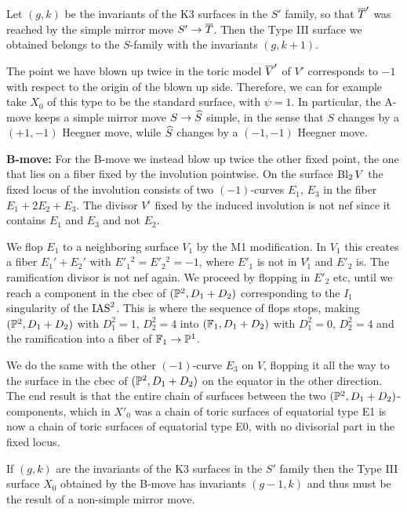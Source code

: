 \documentclass{amsart}
\begin{document}
Let $(g,k)$ be the invariants of the K3 surfaces in the $S'$ family,
so that ${\overline T}'$ was reached by the simple mirror move $S'\to
{\overline T}$. Then the Type III surface we obtained belongs to the $S$-family
with the invariants $(g,k+1)$.

The point we have blown up twice in the toric model ${\overline V}'$ of $V'$
corresponds to $-1$ with respect to the origin of the blown up side.
Therefore, we can for
example take $X_0$ of this type to be the standard surface, with
$\psi=1$. In particular, the A-move keeps a simple mirror move
$S\to {\widehat S}$ simple, in the sense that $S$ changes by a $(+1,-1)$ Heegner
move, while ${\widehat S}$ changes by a $(-1,-1)$ Heegner move. 

\smallskip

{\bf B-move:} For the B-move we instead blow up twice the other fixed point, the
one that lies on a fiber fixed by the involution pointwise. On the
surface $\operatorname{Bl}_2 V$ the fixed locus of the involution consists of two
$(-1)$-curves $E_1$, $E_3$ in the fiber $E_1+2E_2+E_3$. The divisor
$V^\iota$ fixed by the induced involution is not nef since it contains
$E_1$ and $E_3$ and not $E_2$. 

We flop $E_1$ to a neighboring surface $V_1$ by the
M1 modification. In $V_1$ this creates a fiber $E_1'+E_2'$
with $E'_1{}^2=E'_2{}^2=-1$, where $E'_1$ is not in $V_1^\iota$ and
$E'_2$ is. The ramification divisor is not nef again. We proceed by
flopping in $E'_2$ etc, until we reach a component in the cbec of
$({\mathbb P}^2,D_1+D_2)$ corresponding to the $I_1$ singularity of the
$\operatorname{IAS}^2$. This is where the sequence of flops stops, making
$({\mathbb P}^2,D_1+D_2)$ with $D_1^2=1$, $D_2^2=4$ into $({\mathbb F}_1, D_1+D_2)$
with $D_1^2=0$, $D_2^2=4$ and the ramification into a fiber of
${\mathbb F}_1\to{\mathbb P}^1$.

We do the same with the other $(-1)$-curve $E_3$ on $V$, flopping it
all the way to the surface in the cbec of $({\mathbb P}^2,D_1+D_2)$ on the
equator in the other direction. The end result is that the entire
chain of surfaces between the two $({\mathbb P}^2,D_1+D_2)$-components, which
in $X'_0$ was a chain of toric surfaces of equatorial type E1 is now a
chain of toric surfaces of equatorial type E0, with no divisorial part
in the fixed locus.

If $(g,k)$ are the invariants of the
K3 surfaces in the $S'$ family then the Type III surface $X_0$
obtained by the B-move has invariants $(g-1,k)$ and thus must be the
result of a non-simple mirror move.

\medskip
\end{document}
